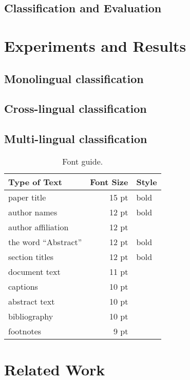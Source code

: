 \documentclass[11pt,a4paper]{article}
\begin{document}
\subsection{Classification and Evaluation}

\section{Experiments and Results}
\label{sec:results}

\subsection{Monolingual classification}


\subsection{Cross-lingual classification}


\subsection{Multi-lingual classification}


\begin{table}[t!]
\begin{center}
\begin{tabular}{|l|rl|}
\hline \bf Type of Text & \bf Font Size & \bf Style \\ \hline
paper title & 15 pt & bold \\
author names & 12 pt & bold \\
author affiliation & 12 pt & \\
the word ``Abstract'' & 12 pt & bold \\
section titles & 12 pt & bold \\
document text & 11 pt  &\\
captions & 10 pt & \\
abstract text & 10 pt & \\
bibliography & 10 pt & \\
footnotes & 9 pt & \\
\hline
\end{tabular}
\end{center}
\caption{\label{font-table} Font guide. }
\end{table}

\section{Related Work}
\label{sec:related}
\end{document}
